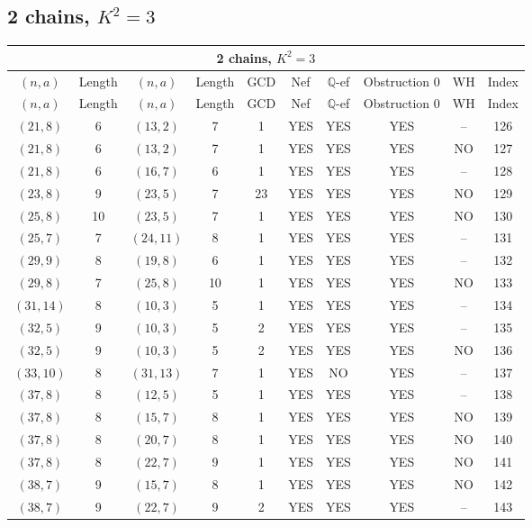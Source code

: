 \subsection{2 chains, $K^2 = 3$}
\begin{longtable}{|c|c|c|c|c|c|c|c|c|c|}
\hline
\multicolumn{10}{|c|}{2 chains, $K^2 = 3$}\\
\hline
$(n,a)$ & Length & $(n,a)$ & Length & GCD & Nef & $\mathbb Q$-ef & Obstruction 0 & WH & Index\\
\hline
\endfirsthead

\hline
$(n,a)$ & Length & $(n,a)$ & Length & GCD & Nef & $\mathbb Q$-ef & Obstruction 0 & WH & Index\\
\hline
\endhead
\hline
\endfoot

$(21, 8)$ & 6 & $(13, 2)$ & 7 & 1 & YES & YES & YES & -- & 126\\
$(21, 8)$ & 6 & $(13, 2)$ & 7 & 1 & YES & YES & YES & NO & 127\\
$(21, 8)$ & 6 & $(16, 7)$ & 6 & 1 & YES & YES & YES & -- & 128\\
$(23, 8)$ & 9 & $(23, 5)$ & 7 & 23 & YES & YES & YES & NO & 129\\
$(25, 8)$ & 10 & $(23, 5)$ & 7 & 1 & YES & YES & YES & NO & 130\\
$(25, 7)$ & 7 & $(24, 11)$ & 8 & 1 & YES & YES & YES & -- & 131\\
$(29, 9)$ & 8 & $(19, 8)$ & 6 & 1 & YES & YES & YES & -- & 132\\
$(29, 8)$ & 7 & $(25, 8)$ & 10 & 1 & YES & YES & YES & NO & 133\\
$(31, 14)$ & 8 & $(10, 3)$ & 5 & 1 & YES & YES & YES & -- & 134\\
$(32, 5)$ & 9 & $(10, 3)$ & 5 & 2 & YES & YES & YES & -- & 135\\
$(32, 5)$ & 9 & $(10, 3)$ & 5 & 2 & YES & YES & YES & NO & 136\\
$(33, 10)$ & 8 & $(31, 13)$ & 7 & 1 & YES & NO & YES & -- & 137\\
$(37, 8)$ & 8 & $(12, 5)$ & 5 & 1 & YES & YES & YES & -- & 138\\
$(37, 8)$ & 8 & $(15, 7)$ & 8 & 1 & YES & YES & YES & NO & 139\\
$(37, 8)$ & 8 & $(20, 7)$ & 8 & 1 & YES & YES & YES & NO & 140\\
$(37, 8)$ & 8 & $(22, 7)$ & 9 & 1 & YES & YES & YES & NO & 141\\
$(38, 7)$ & 9 & $(15, 7)$ & 8 & 1 & YES & YES & YES & NO & 142\\
$(38, 7)$ & 9 & $(22, 7)$ & 9 & 2 & YES & YES & YES & -- & 143\\

\end{longtable}
